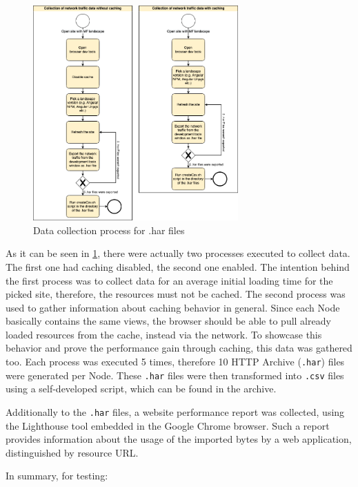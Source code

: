 \begin{figure}[!h]
	\centering
	\includegraphics[width=0.7\textwidth]{Figures/Data_Collection_Process_har.drawio.png}
	\caption{Data collection process for .har files}
	\label{fig:data_collection_process_har}
\end{figure}

As it can be seen in \ref{fig:data_collection_process_har}, there were actually two processes executed to collect data. 
The first one had caching disabled, the second one enabled. 
The intention behind the first process was to collect data for an average initial loading time for the picked site, therefore, the resources must not be cached. 
The second process was used to gather information about caching behavior in general. 
Since each Node basically contains the same views, the browser should be able to pull already loaded resources from the cache, instead via the network. 
To showcase this behavior and prove the performance gain through caching, this data was gathered too.
Each process was executed 5 times, therefore 10 HTTP Archive (\texttt{.har}) files were generated per Node. 
These \texttt{.har} files were then transformed into \texttt{.csv} files using a self-developed script, which can be found in the archive.

Additionally to the \texttt{.har} files, a website performance report was collected, using the Lighthouse tool embedded in the Google Chrome browser. Such a report provides information about the usage of the imported bytes by a web application, distinguished by resource URL.

In summary, for testing:

